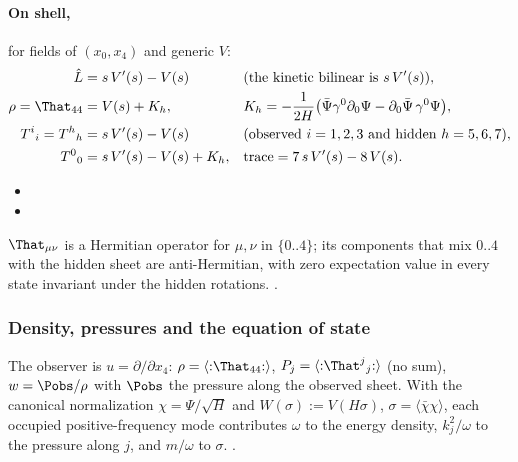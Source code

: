 \paragraph{On shell,} for fields of $(x_0,x_4)$ and generic $V$:
\begin{align*}
  \hat L&=s\,V'(s)-V(s) &&\text{(the kinetic bilinear is } s\,V'(s)\text{)},\\
  \rho=\That_{44}&=V(s)+K_h, &&K_h=-\frac{1}{2H}\bigl(\bar\Psi\gamma^0\partial_0\Psi-\partial_0\bar\Psi\,\gamma^0\Psi\bigr),\\
  T^i{}_i=T^h{}_h&=s\,V'(s)-V(s) &&\text{(observed } i=1,2,3\text{ and hidden } h=5,6,7\text{)},\\
  T^0{}_0&=s\,V'(s)-V(s)+K_h, &&\text{trace}=7\,s\,V'(s)-8\,V(s).
\end{align*}
\begin{itemize}
  \item {}
  \item {}
\end{itemize}
$\That_{\mu\nu}$ is a Hermitian operator for $\mu,\nu$ in $\{0..4\}$; its components that mix $0..4$ with
the hidden sheet are anti-Hermitian, with zero expectation value in every state invariant under the
hidden rotations.  .

\subsubsection{Density, pressures and the equation of state}
\label{sec:4.1.6}

The observer is $u=\partial/\partial x_4$: $\rho=\langle{:}\That_{44}{:}\rangle$,
$P_j=\langle{:}\That^j{}_j{:}\rangle$ (no sum), $w=\Pobs/\rho$ with $\Pobs$ the pressure along the
observed sheet. With the canonical normalization $\chi=\Psi/\sqrt H$ and $W(\sigma):=V(H\sigma)$,
$\sigma=\langle\bar\chi\chi\rangle$, each occupied positive-frequency mode contributes $\omega$ to the
energy density, $k_j^2/\omega$ to the pressure along $j$, and $m/\omega$ to $\sigma$.
 .

